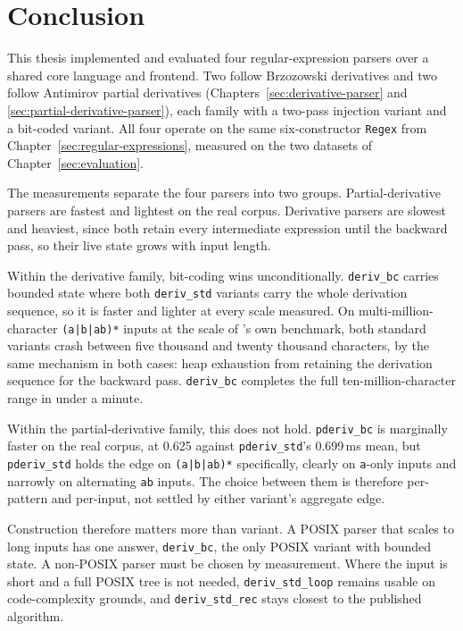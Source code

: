\chapter{Conclusion}
\label{sec:conclusion}

This thesis implemented and evaluated four regular-expression parsers
over a shared core language and frontend. Two follow Brzozowski
derivatives and two follow Antimirov partial derivatives
(Chapters~\ref{sec:derivative-parser} and
\ref{sec:partial-derivative-parser}), each family with a two-pass
injection variant and a bit-coded variant. All four operate on the
same six-constructor \texttt{Regex} from
Chapter~\ref{sec:regular-expressions}, measured on the two datasets of
Chapter~\ref{sec:evaluation}.

The measurements separate the four parsers into two groups.
Partial-derivative parsers are fastest and lightest on the real
corpus. Derivative parsers are slowest and heaviest, since both retain
every intermediate expression until the backward pass, so their live
state grows with input length.

Within the derivative family, bit-coding wins unconditionally.
\texttt{deriv\_bc} carries bounded state where both
\texttt{deriv\_std} variants carry the whole derivation sequence, so
it is faster and lighter at every scale measured. On
multi-million-character \texttt{(a|b|ab)*} inputs at the scale of
\citet{sulzmannlu2014}'s own benchmark, both standard variants crash
between five thousand and twenty thousand characters, by the same
mechanism in both cases: heap exhaustion from retaining the
derivation sequence for the backward pass. \texttt{deriv\_bc}
completes the full ten-million-character range in under a minute.

Within the partial-derivative family, this does not hold.
\texttt{pderiv\_bc} is marginally faster on the real corpus, at
0.625 against \texttt{pderiv\_std}'s 0.699\,ms mean, but
\texttt{pderiv\_std} holds the edge on \texttt{(a|b|ab)*}
specifically, clearly on \texttt{a}-only inputs and narrowly on
alternating \texttt{ab} inputs. The choice between them is therefore
per-pattern and per-input, not settled by either variant's aggregate
edge.

Construction therefore matters more than variant. A POSIX parser
that scales to long inputs has one answer, \texttt{deriv\_bc}, the
only POSIX variant with bounded state. A non-POSIX parser must be
chosen by measurement. Where the input is short and a full POSIX tree
is not needed, \texttt{deriv\_std\_loop} remains usable on
code-complexity grounds, and \texttt{deriv\_std\_rec} stays closest
to the published algorithm.

